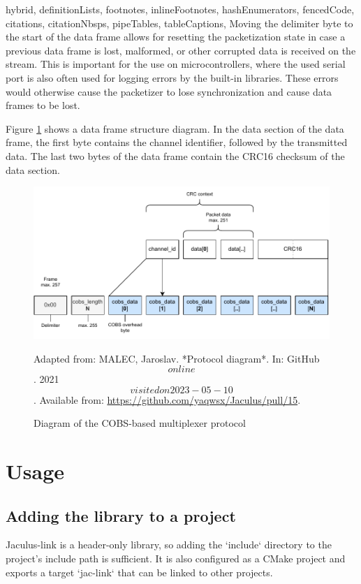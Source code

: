 \begin{markdown*}{%
  hybrid,
  definitionLists,
  footnotes,
  inlineFootnotes,
  hashEnumerators,
  fencedCode,
  citations,
  citationNbsps,
  pipeTables,
  tableCaptions,
}
Moving the delimiter byte to the start of the data frame allows for resetting the packetization state in case a previous data frame is lost, malformed, or other corrupted data is received on the stream. This is important for the use on microcontrollers, where the used serial port is also often used for logging errors by the built-in libraries. These errors would otherwise cause the packetizer to lose synchronization and cause data frames to be lost.

Figure \ref{fig:cobs-diagram} shows a data frame structure diagram. In the data section of the data frame, the first byte contains the channel identifier, followed by the transmitted data. The last two bytes of the data frame contain the CRC16 checksum of the data section.


\begin{figure}[!ht]
    \centering
    \includegraphics[width=\textwidth]{img/cobs-diagram}
    \raggedright
    \footnotesize{Adapted from: MALEC, Jaroslav. *Protocol diagram*. In: GitHub \[online\]. 2021 \[visited on 2023-05-10\]. Available from: \url{https://github.com/yaqwsx/Jaculus/pull/15}.}
    \caption{Diagram of the COBS-based multiplexer protocol}
    \label{fig:cobs-diagram}
\end{figure}


\section{Usage} \label{sec:link-usage}

\subsection{Adding the library to a project}

Jaculus-link is a header-only library, so adding the `include` directory to the project's include path is sufficient. It is also configured as a CMake project and exports a target `jac-link` that can be linked to other projects.


\end{markdown*}
